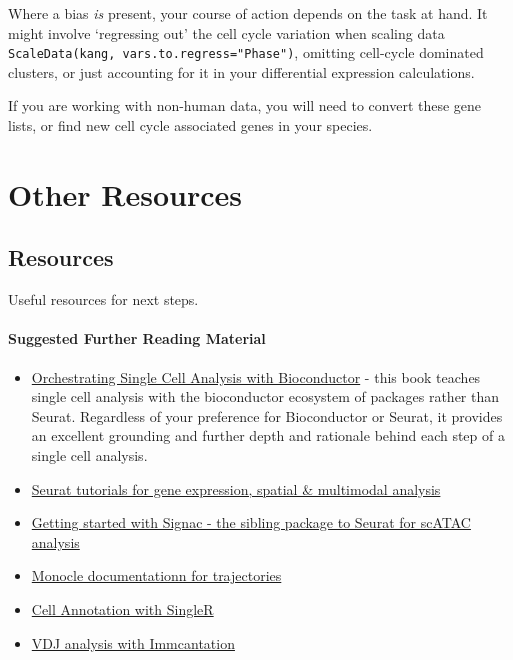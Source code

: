 \documentclass[
]{book}
\providecommand{\tightlist}{%
  \setlength{\itemsep}{0pt}\setlength{\parskip}{0pt}}
\begin{document}
Where a bias \emph{is} present, your course of action depends on the task at hand. It might involve `regressing out' the cell cycle variation when scaling data \texttt{ScaleData(kang,\ vars.to.regress="Phase")}, omitting cell-cycle dominated clusters, or just accounting for it in your differential expression calculations.

If you are working with non-human data, you will need to convert these gene lists, or find new cell cycle associated genes in your species.

\part{Other Resources}\label{part-other-resources}

\chapter{Resources}\label{resources}

Useful resources for next steps.

\subsection{Suggested Further Reading Material}\label{suggested-further-reading-material}

\begin{itemize}
\tightlist
\item
  \href{https://bioconductor.org/books/release/OSCA/}{Orchestrating Single Cell Analysis with Bioconductor} - this book teaches single cell analysis with the bioconductor ecosystem of packages rather than Seurat. Regardless of your preference for Bioconductor or Seurat, it provides an excellent grounding and further depth and rationale behind each step of a single cell analysis.
\item
  \href{https://satijalab.org/seurat/articles/get_started.html}{Seurat tutorials for gene expression, spatial \& multimodal analysis}
\item
  \href{https://satijalab.org/signac/articles/overview.html}{Getting started with Signac - the sibling package to Seurat for scATAC analysis}
\item
  \href{https://cole-trapnell-lab.github.io/monocle3/docs/trajectories/}{Monocle documentationn for trajectories}
\item
  \href{http://bioconductor.org/books/devel/SingleRBook/}{Cell Annotation with SingleR}
\item
  \href{https://immcantation.readthedocs.io/en/stable/}{VDJ analysis with Immcantation}
\end{itemize}
\end{document}
